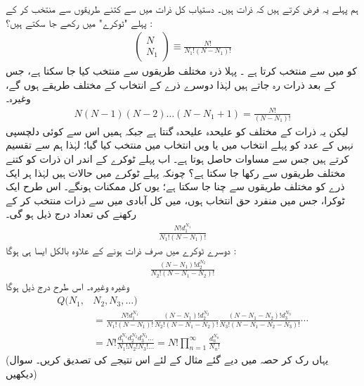   ہم پہلے یہ فرض کرتے ہیں کہ ذرات   ہیں۔ دستیاب کل   ذرات میں سے کتنے طریقوں سے  منتخب کر کے پہلے   "ٹوکرے"  میں رکھے  جا سکتے  ہیں؟  :
\begin{align}\label{مساوات_متماثل_ثنائی_عددی_سر_پہلا}
\begin{pmatrix}
N \\
N_1
\end{pmatrix}
\equiv \frac{N!}{N_1 ! (N - N_1) !}
\end{align}
  کو  میں سے منتخب کرتا ہے ۔ پہلا ذرہ  مختلف طریقوں سے منتخب کیا جا سکتا ہے،  جس کے بعد  ذرات رہ جاتے ہیں لہٰذا دوسرے ذرے کے انتخاب کے  مختلف طریقے ہوں گے، وغیرہ۔ 
\begin{align*}
N(N - 1) (N - 2) \dotsc (N - N_1 + 1) = \frac{N !}{(N - N_1) !}
\end{align*}
لیکن یہ  ذرات کے  مختلف  کو علیحدہ علیحدہ گنتا  ہے جبکہ ہمیں اس سے کوئی دلچسپی نہیں کے عدد  کو پہلے انتخاب میں یا  ویں انتخاب میں منتخب کیا گیا؛  لہٰذا ہم  سے تقسیم کرتے ہیں جس سے مساوات  حاصل ہوتا ہے۔  اب پہلے  ٹوکرے کے اندر  ان  ذرات کو کتنے مختلف طریقوں سے رکھا جا سکتا ہے؟ چونکہ پہلے ٹوکرے  میں  حالات ہیں لہٰذا ہر ایک ذرے  کو  مختلف طریقوں سے چنا جا سکتا ہے؛  یوں  کل ممکنات  ہونگے۔  اس طرح ایک ٹوکرا،  جس میں  منفرد  حق انتخاب  ہوں،  میں کل آبادی  میں سے  ذرات منتخب کر کے رکھنے کی تعداد  درج ذیل  ہو گی۔ 
\begin{align*}
\frac{N ! d_1^{N_1}}{N_1 ! (N - N_1) !}
\end{align*}
دوسرے ٹوکرے میں صرف  ذرات ہونے کے علاوہ بالکل ایسا ہی ہوگا :
\begin{align*}
\frac{(N - N_1) ! d_2^{N_2}}{N_2 ! (N - N_1 - N_2) !}
\end{align*}
وغیرہ وغیرہ۔  اس طرح درج ذیل ہوگا 
\begin{align}\label{مساوات_متماثل_قابل_ممیز_اجتماعات}
Q (N_1 , &N_2 , N_3 , \dotsc) \nonumber\\
&= \frac{N ! d_1^{N_1}}{N_1 ! (N - N_1) !} \frac{(N - N_1) ! d_2^{N_2}}{N_2 ! (N - N_1 - N_2) !} \frac{(N - N_1 - N_2) ! d_3^{N_3}}{N_3 ! (N - N_1 - N_2 - N_3) !} \cdots \nonumber\\
&= N ! \frac{d_1^{N_1} d_2^{N_2} d_3^{N_3} \dotsc}{N_1 ! N_2 ! N_3 ! \dotsc} = N! \prod_{n = 1}^{\infty} \frac{d_n^{N_n}}{N_n !}
\end{align}
(یہاں رک کر  حصہ    میں دیے گئے مثال کے لئے  اس نتیجے کی تصدیق کریں۔   سوال    دیکھیں)

